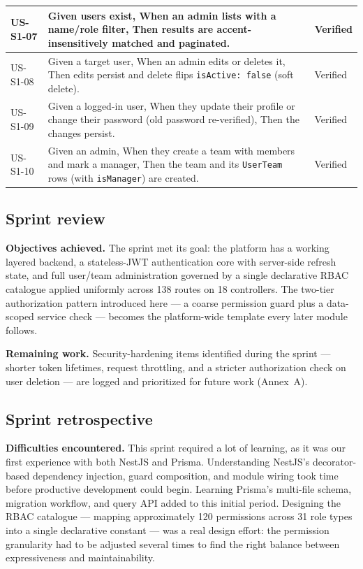 \begin{longtable}{@{}p{1.8cm}p{8.3cm}p{3.8cm}@{}}
\midrule
US-S1-07 & Given users exist, When an admin lists with a name/role filter, Then results are accent-insensitively matched and paginated. & \pass{} Verified \\
\midrule
US-S1-08 & Given a target user, When an admin edits or deletes it, Then edits persist and delete flips \texttt{isActive: false} (soft delete). & \pass{} Verified \\
\midrule
US-S1-09 & Given a logged-in user, When they update their profile or change their password (old password re-verified), Then the changes persist. & \pass{} Verified \\
\midrule
US-S1-10 & Given an admin, When they create a team with members and mark a manager, Then the team and its \texttt{UserTeam} rows (with \texttt{isManager}) are created. & \pass{} Verified \\
\end{longtable}

\subsection{Sprint review}

\textbf{Objectives achieved.} The sprint met its goal: the platform has a working layered
backend, a stateless-JWT authentication core with server-side refresh state, and full user/team
administration governed by a single declarative RBAC catalogue applied uniformly across 138
routes on 18 controllers. The two-tier authorization pattern introduced here --- a coarse
permission guard plus a data-scoped service check --- becomes the platform-wide template every
later module follows.

\textbf{Remaining work.} Security-hardening items identified during the sprint --- shorter token
lifetimes, request throttling, and a stricter authorization check on user deletion --- are logged
and prioritized for future work (Annex~A).

\subsection{Sprint retrospective}

\textbf{Difficulties encountered.} This sprint required a lot of learning, as it was our
first experience with both NestJS and Prisma. Understanding NestJS's decorator-based
dependency injection, guard composition, and module wiring took time before productive
development could begin. Learning Prisma's multi-file schema, migration workflow, and query API
added to this initial period. Designing the RBAC catalogue --- mapping approximately 120
permissions across 31 role types into a single declarative constant --- was a real design
effort: the permission granularity had to be adjusted several times to find the right balance
between expressiveness and maintainability.

